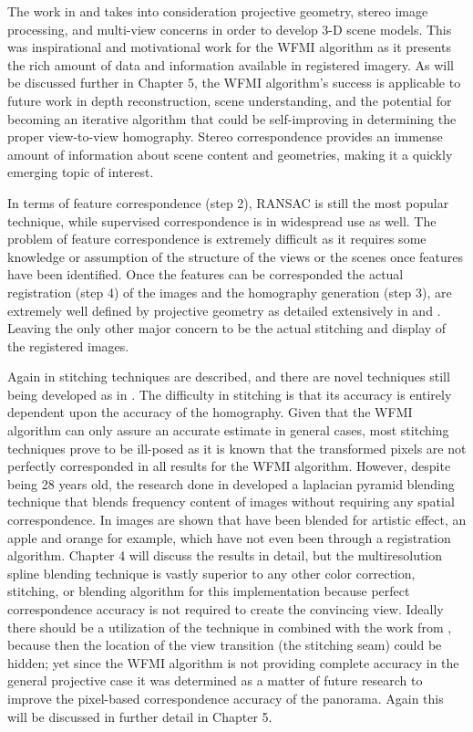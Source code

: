   The work in \cite{Walli2009} and \cite{Nilosek2009} takes into consideration projective geometry, stereo image processing, and multi-view concerns in order to develop 3-D scene models. This was inspirational and motivational work for the WFMI algorithm as it presents the rich amount of data and information available in registered imagery. As will be discussed further in Chapter 5, the WFMI algorithm's success is applicable to future work in depth reconstruction, scene understanding, and the potential for becoming an iterative algorithm that could be self-improving in determining the proper view-to-view homography. Stereo correspondence provides an immense amount of information about scene content and geometries, making it a quickly emerging topic of interest.
  
  In terms of feature correspondence (step 2), RANSAC \cite{Brown2007} is still the most popular technique, while supervised correspondence is in widespread use as well. The problem of feature correspondence is extremely difficult as it requires some knowledge or assumption of the structure of the views or the scenes once features have been identified. Once the features can be corresponded the actual  registration (step 4) of the images and the homography generation (step 3), are extremely well defined by projective geometry as detailed extensively in \cite{Faugeras2004} and \cite{Hartley2003}. Leaving the only other major concern to be the actual stitching and display of the registered images.
  
   Again in \cite{Zitova2003} stitching techniques are described, and there are novel techniques still being developed as in \cite{Haenselmann2009}. The difficulty in stitching is that its accuracy is entirely dependent upon the accuracy of the homography. Given that the WFMI algorithm can only assure an accurate estimate in general cases, most stitching techniques prove to be ill-posed as it is known that the transformed pixels are not perfectly corresponded in all results for the WFMI algorithm. However, despite being 28 years old, the research done in \cite{Burt1983} developed a laplacian pyramid blending technique that blends frequency content of images without requiring any spatial correspondence. In \cite{Burt1983} images are shown that have been blended for artistic effect, an apple and orange for example, which have not even been through a registration algorithm. Chapter 4 will discuss the results in detail, but the multiresolution spline blending technique is vastly superior to any other color correction, stitching, or blending algorithm for this implementation because perfect correspondence accuracy is not required to create the convincing view. Ideally there should be a utilization of the technique in \cite{Haenselmann2009} combined with the work from \cite{Burt1983}, because then the location of the view transition (the stitching seam) could be hidden; yet since the WFMI algorithm is not providing complete accuracy in the general projective case it was determined as a matter of future research to improve the pixel-based correspondence accuracy of the panorama. Again this will be discussed in further detail in Chapter 5.
   
